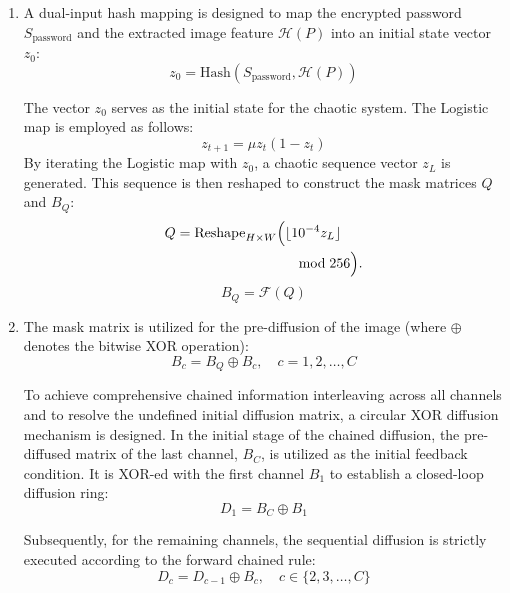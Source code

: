\documentclass[10pt,twocolumn]{article}
\theoremstyle{definition}
\begin{document}
\begin{enumerate}
\item
A dual-input hash mapping is designed to map the encrypted password $S_{\text{password}}$ and the extracted image feature $\mathcal{H}(P)$ into an initial state vector $z_0$:
\begin{equation}
	z_0 = \text{Hash}(S_{\text{password}}, \mathcal{H}(P))
\end{equation}

The vector $z_0$ serves as the initial state for the chaotic system. The Logistic map is employed as follows:
\begin{equation}
	z_{t+1} = \mu z_t(1 - z_t)
\end{equation}
By iterating the Logistic map with $z_0$, a chaotic sequence vector $z_L$ is generated. This sequence is then reshaped to construct the mask matrices $Q$ and $B_Q$:
\begin{equation}
\begin{aligned}
Q={}&\mathrm{Reshape}_{H\times W}\Bigl(
\lfloor10^{-4}z_L\rfloor\\
&\hspace{7.2em}\bmod 256\Bigr).
\end{aligned}
\end{equation}
\begin{equation}
	B_Q = \mathcal{F}(Q)
\end{equation}

\item
The mask matrix is utilized for the pre-diffusion of the image (where $\oplus$ denotes the bitwise XOR operation):
\begin{equation}
	B_c = B_Q \oplus B_c, \quad c = 1, 2, \dots, C
\end{equation}

To achieve comprehensive chained information interleaving across all channels and to resolve the undefined initial diffusion matrix, a circular XOR diffusion mechanism is designed. In the initial stage of the chained diffusion, the pre-diffused matrix of the last channel, $B_C$, is utilized as the initial feedback condition. It is XOR-ed with the first channel $B_1$ to establish a closed-loop diffusion ring:
\begin{equation}
	D_1 = B_C \oplus B_1
\end{equation}

Subsequently, for the remaining channels, the sequential diffusion is strictly executed according to the forward chained rule:
\begin{equation}
	D_c = D_{c-1} \oplus B_c, \quad c \in \{2, 3, \dots, C\}
\end{equation}


\end{enumerate}
\end{document}
